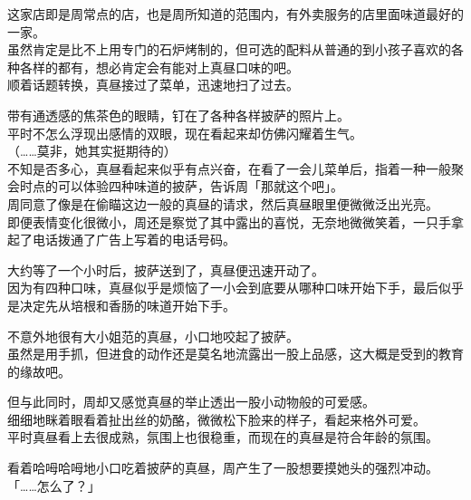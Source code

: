 这家店即是周常点的店，也是周所知道的范围内，有外卖服务的店里面味道最好的一家。\\

虽然肯定是比不上用专门的石炉烤制的，但可选的配料从普通的到小孩子喜欢的各种各样的都有，想必肯定会有能对上真昼口味的吧。\\

顺着话题转换，真昼接过了菜单，迅速地扫了过去。

带有通透感的焦茶色的眼睛，钉在了各种各样披萨的照片上。\\

平时不怎么浮现出感情的双眼，现在看起来却仿佛闪耀着生气。\\

（……莫非，她其实挺期待的）\\

不知是否多心，真昼看起来似乎有点兴奋，在看了一会儿菜单后，指着一种一般聚会时点的可以体验四种味道的披萨，告诉周「那就这个吧」。\\

周同意了像是在偷瞄这边一般的真昼的请求，然后真昼眼里便微微泛出光亮。\\

即便表情变化很微小，周还是察觉了其中露出的喜悦，无奈地微微笑着，一只手拿起了电话拨通了广告上写着的电话号码。\\

\vspace{2\baselineskip}

大约等了一个小时后，披萨送到了，真昼便迅速开动了。\\

因为有四种口味，真昼似乎是烦恼了一小会到底要从哪种口味开始下手，最后似乎是决定先从培根和香肠的味道开始下手。

不意外地很有大小姐范的真昼，小口地咬起了披萨。\\

虽然是用手抓，但进食的动作还是莫名地流露出一股上品感，这大概是受到的教育的缘故吧。

但与此同时，周却又感觉真昼的举止透出一股小动物般的可爱感。\\

细细地眯着眼看着扯出丝的奶酪，微微松下脸来的样子，看起来格外可爱。\\

平时真昼看上去很成熟，氛围上也很稳重，而现在的真昼是符合年龄的氛围。

看着哈呣哈呣地小口吃着披萨的真昼，周产生了一股想要摸她头的强烈冲动。\\

「……怎么了？」

